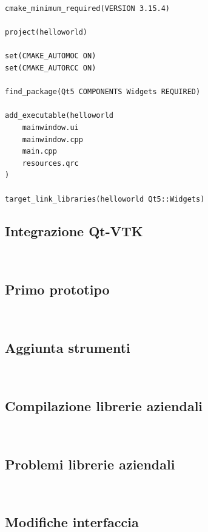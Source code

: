 \begin{verbatim}
cmake_minimum_required(VERSION 3.15.4)

project(helloworld)

set(CMAKE_AUTOMOC ON)
set(CMAKE_AUTORCC ON)

find_package(Qt5 COMPONENTS Widgets REQUIRED)

add_executable(helloworld
    mainwindow.ui
    mainwindow.cpp
    main.cpp
    resources.qrc
)

target_link_libraries(helloworld Qt5::Widgets)
\end{verbatim}


\subsection{Integrazione Qt-VTK}
\\

\subsection{Primo prototipo}
\\

\subsection{Aggiunta strumenti}
\\

\subsection{Compilazione librerie aziendali}
\\

\subsection{Problemi librerie aziendali}
\\

\subsection{Modifiche interfaccia}
\\

